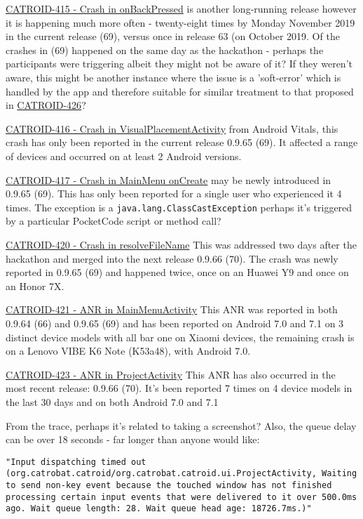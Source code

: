 \href{https://jira.catrob.at/browse/CATROID-415}{CATROID-415 - Crash in onBackPressed} is another long-running release however it is happening much more often - twenty-eight times by Monday  November 2019 in the current release (69), versus once in release 63 (on  October 2019. Of the crashes in (69) happened on the same day as the hackathon - perhaps the participants were triggering albeit they might not be aware of it? If they weren't aware, this might be another instance where the issue is a 'soft-error' which is handled by the app and therefore suitable for similar treatment to that proposed in \href{https://jira.catrob.at/browse/CATROID-426}{CATROID-426}?

\href{https://jira.catrob.at/browse/CATROID-416}{CATROID-416 - Crash in VisualPlacementActivity} from Android Vitals, this crash has only been reported in the current release 0.9.65 (69). It affected a range of devices and occurred on at least 2 Android versions.

\href{https://jira.catrob.at/browse/CATROID-417}{CATROID-417 - Crash in MainMenu onCreate} may be newly introduced in 0.9.65 (69). This has only been reported for a single user who experienced it 4 times. The exception is a \texttt{java.lang.ClassCastException} perhaps it's triggered by a particular PocketCode script or method call?

\href{https://jira.catrob.at/browse/CATROID-420}{CATROID-420 - Crash in resolveFileName} This was addressed two days after the hackathon and merged into the next release 0.9.66 (70). The crash was newly reported in 0.9.65 (69) and happened twice, once on an Huawei Y9 and once on an Honor 7X.

\href{https://jira.catrob.at/browse/CATROID-421}{CATROID-421 - ANR in MainMenuActivity} This ANR was reported in both 0.9.64 (66) and 0.9.65 (69) and has been reported on Android 7.0 and 7.1 on 3 distinct device models with all bar one on Xiaomi devices, the remaining crash is on a Lenovo VIBE K6 Note (K53a48), with Android 7.0.

\href{https://jira.catrob.at/browse/CATROID-423}{CATROID-423 - ANR in ProjectActivity} This ANR has also occurred in the most recent release: 0.9.66 (70). It's been reported 7 times on 4 device models in the last 30 days and on both Android 7.0 and 7.1

From the trace, perhaps it's related to taking a screenshot? Also, the queue delay can be over 18 seconds - far longer than anyone would like:

\texttt{\small{"Input dispatching timed out (org.catrobat.catroid/org.catrobat.catroid.ui.ProjectActivity, Waiting to send non-key event because the touched window has not finished processing certain input events that were delivered to it over 500.0ms ago. Wait queue length: 28. Wait queue head age: 18726.7ms.)"}}

